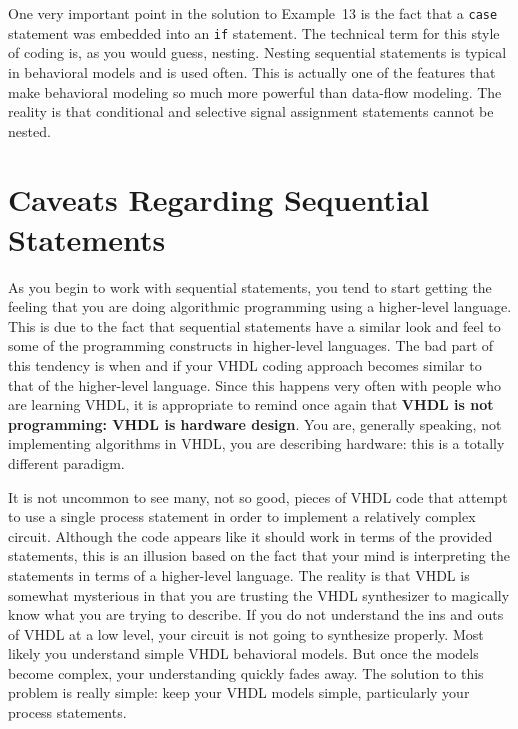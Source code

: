 One very important point in the solution to Example~13 is the fact that a \texttt{case} statement was embedded into an \texttt{if} statement. The technical term for this style of coding is, as you would guess, nesting. Nesting sequential statements is typical in behavioral models and is used often. This is actually one of the features that make behavioral modeling so much more powerful than data-flow modeling. The reality is that conditional and selective signal assignment statements cannot be nested.

\section{Caveats Regarding Sequential Statements}
As you begin to work with sequential statements, you tend to start getting the feeling that you are doing algorithmic programming using a higher-level language. This is due to the fact that sequential statements have a similar look and feel to some of the programming constructs in higher-level languages. The bad part of this tendency is when and if your VHDL coding approach becomes similar to that of the higher-level language. Since this happens very often with people who are learning VHDL, it is appropriate to remind once again that \textbf{VHDL is not programming: VHDL is hardware design}. You are, generally speaking, not implementing algorithms in VHDL, you are describing hardware: this is a totally different paradigm.

It is not uncommon to see many, not so good, pieces of VHDL code that attempt to use a single process statement in order to implement a relatively complex circuit. Although the code appears like it should work in terms of the provided statements, this is an illusion based on the fact that your mind is interpreting the statements in terms of a higher-level language. The reality is that VHDL is somewhat mysterious in that you are trusting the VHDL synthesizer to magically know what you are trying to describe. If you do not understand the ins and outs of VHDL at a low level, your circuit is not going to synthesize properly. Most likely you understand simple VHDL behavioral models. But once the models become complex, your understanding quickly fades away. The solution to this problem is really simple: keep your VHDL models simple, particularly your process statements. 

